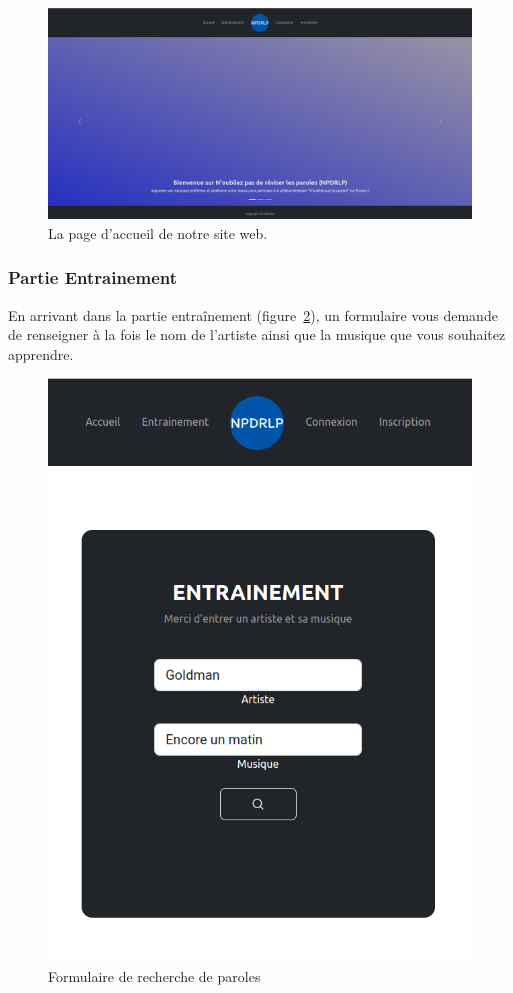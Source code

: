 \documentclass[12pt,french]{article}
\begin{document}
\begin{figure}[H]
	\centering
	\includegraphics[scale=0.25]{accueil.png}
	\caption{La page d'accueil de notre site web.}
	\label{figure10} 
\end{figure}


\subsubsection{Partie Entrainement}

En arrivant dans la partie entraînement (figure~\ref{figure11}), un formulaire vous demande de renseigner à la fois le nom de l'artiste ainsi que la musique que vous souhaitez apprendre.

\begin{figure}[H]
	\centering
	\includegraphics[scale=0.25]{rechercheparole.png}
	\caption{Formulaire de recherche de paroles}
	\label{figure11} 
\end{figure}
\end{document}

